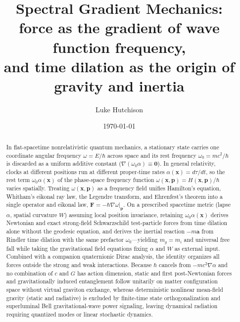 \documentclass[aps,prd,onecolumn,tightenlines,nofootinbib,notitlepage,10pt,floatfix]{revtex4-2}
\theoremstyle{indentedtheorem}
\begin{document}
\title{Spectral Gradient Mechanics:\texorpdfstring{\\}{ }%
force as the gradient of wave function frequency,\texorpdfstring{\\}{ }%
and time dilation as the origin of gravity and inertia}

\newif\ifanonymous \anonymousfalse %
\newcommand{\companionauthor}{\ifanonymous Anonymous\else L.~Hutchison\fi}
\ifanonymous\else\author{Luke Hutchison}
\noaffiliation\fi
\date{\today}

\begin{abstract}
In flat-spacetime nonrelativistic quantum mechanics, a stationary state carries one coordinate angular frequency $\omega=E/\hbar$ across space and its rest frequency $\omega_0=mc^2/\hbar$ is discarded as a uniform additive constant ($\nabla(\omega_0\alpha)\equiv\mathbf{0}$). In general relativity, clocks at different positions run at different proper-time rates $\alpha(\mathbf{x})=d\tau/dt$, so the rest term $\omega_0\alpha(\mathbf{x})$ of the phase-space frequency function $\omega(\mathbf{x},\mathbf{p})=H(\mathbf{x},\mathbf{p})/\hbar$ varies spatially. Treating $\omega(\mathbf{x},\mathbf{p})$ as a frequency field unifies Hamilton's equation, Whitham's eikonal ray law, the Legendre transform, and Ehrenfest's theorem into a single operator and eikonal law, $\mathbf{F}=-\hbar\nabla\omega|_{\mathbf{p}}$. On a prescribed spacetime metric (lapse $\alpha$, spatial curvature $W$) assuming local position invariance, retaining $\omega_0\alpha(\mathbf{x})$ derives Newtonian and exact strong-field Schwarzschild test-particle forces from time dilation alone without the geodesic equation, and derives the inertial reaction $-m\mathbf{a}$ from Rindler time dilation with the same prefactor $\omega_0$---yielding $m_g=m_i$ and universal free fall while taking the gravitational field equations fixing $\alpha$ and $W$ as external input. Combined with a companion quaternionic Dirac analysis, the identity organizes all forces outside the strong and weak interactions. Because $\hbar$ cancels from $-mc^2\nabla\alpha$ and no combination of $c$ and $G$ has action dimension, static and first post-Newtonian forces and gravitationally induced entanglement follow unitarily on matter configuration space without virtual graviton exchange, whereas deterministic nonlinear mean-field gravity (static and radiative) is excluded by finite-time state orthogonalization and superluminal Bell gravitational-wave power signaling, leaving dynamical radiation requiring quantized modes or linear stochastic dynamics.
\end{abstract}
\end{document}
